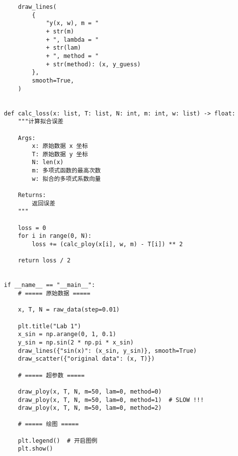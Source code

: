 \begin{verbatim}
    draw_lines(
        {
            "y(x, w), m = "
            + str(m)
            + ", lambda = "
            + str(lam)
            + ", method = "
            + str(method): (x, y_guess)
        },
        smooth=True,
    )


def calc_loss(x: list, T: list, N: int, m: int, w: list) -> float:
    """计算拟合误差

    Args:
        x: 原始数据 x 坐标
        T: 原始数据 y 坐标
        N: len(x)
        m: 多项式函数的最高次数
        w: 拟合的多项式系数向量

    Returns:
        返回误差
    """

    loss = 0
    for i in range(0, N):
        loss += (calc_ploy(x[i], w, m) - T[i]) ** 2

    return loss / 2


if __name__ == "__main__":
    # ===== 原始数据 =====

    x, T, N = raw_data(step=0.01)

    plt.title("Lab 1")
    x_sin = np.arange(0, 1, 0.1)
    y_sin = np.sin(2 * np.pi * x_sin)
    draw_lines({"sin(x)": (x_sin, y_sin)}, smooth=True)
    draw_scatter({"original data": (x, T)})

    # ===== 超参数 =====

    draw_ploy(x, T, N, m=50, lam=0, method=0)
    draw_ploy(x, T, N, m=50, lam=0, method=1)  # SLOW !!!
    draw_ploy(x, T, N, m=50, lam=0, method=2)

    # ===== 绘图 =====

    plt.legend()  # 开启图例
    plt.show()
\end{verbatim}
